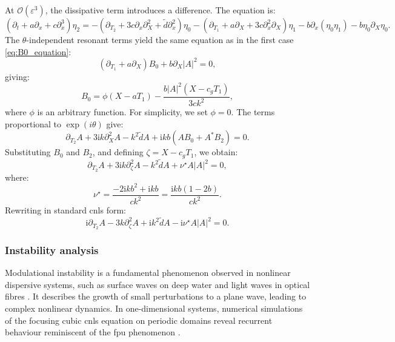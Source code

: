 \documentclass[alpha-refs, 12pt]{wiley-article}
\renewcommand{\O}{\mathcal{O}}
\newcommand{\ui}{\mathrm{i}}
\newcommand{\eps}{\varepsilon}
\begin{document}
At $\O(\eps^3)$, the dissipative term introduces a difference. The equation is:
\begin{equation}\label{eq:third_order_intermediate}
  \left( \partial_t + a \partial_x + c \partial_x^3 \right) \eta_2 = - \left( \partial_{T_2} + 3 c \partial_x \partial_X^2 + \tilde{d} \partial_x^2 \right) \eta_0 - \left( \partial_{T_1} + a \partial_X + 3 c \partial_x^2 \partial_X \right) \eta_1 - b \partial_x ( \eta_0 \eta_1 ) - b \eta_0 \partial_X \eta_0.
\end{equation}
The $\theta$-independent resonant terms yield the same equation as in the first case \eqref{eq:B0_equation}:
\[
  \left( \partial_{T_1} + a \partial_X \right) B_0 + b \partial_X |A|^2 = 0,
\]
giving:
\[
  B_0 = \phi(X - a T_1) - \frac{b |A|^2 (X - c_g T_1)}{3 c k^2},
\]
where $\phi$ is an arbitrary function. For simplicity, we set $\phi = 0$. The terms proportional to $\exp(i \theta)$ give:
\begin{equation}\label{eq:resonant_theta_intermediate}
  \partial_{T_2} A + 3 \ui k \partial_X^2 A - k^2 \tilde{d} A + \ui k b \left( A B_0 + A^* B_2 \right) = 0.
\end{equation}
Substituting $B_0$ and $B_2$, and defining $\zeta = X - c_g T_1$, we obtain:
\begin{equation*}%
  \partial_{T_2} A + 3 \ui k \partial_\zeta^2 A - k^2 \tilde{d} A + \nu^\star A |A|^2 = 0,
\end{equation*}
where:
\[
  \nu^\star = \frac{-2 \ui k b^2 + \ui k b}{c k^2} = \frac{\ui k b (1 - 2 b)}{c k^2}.
\]
Rewriting in standard \acrshort{cnls} form:
\begin{equation}\label{eq:NLS_final_intermediate}
  \ui \partial_{T_2} A - 3 k \partial_\zeta^2 A + \ui k^2 \tilde{d} A - \ui \nu^\star A |A|^2 = 0.
\end{equation}

\subsubsection{Instability analysis}

Modulational instability is a fundamental phenomenon observed in nonlinear dispersive systems, such as surface waves on deep water \cite{Benjamin1967a, Yuen1975, Yuen1980, Remoissenet1996} and light waves in optical fibres \cite{Tai1986}. It describes the growth of small perturbations to a plane wave, leading to complex nonlinear dynamics. In one-dimensional systems, numerical simulations of the focusing cubic \acrfull{cnls} equation on periodic domains reveal recurrent behaviour reminiscent of the \acrfull{fpu} phenomenon \cite{Fermi1955, Yuen1978, Hafizi1981}.
\end{document}
